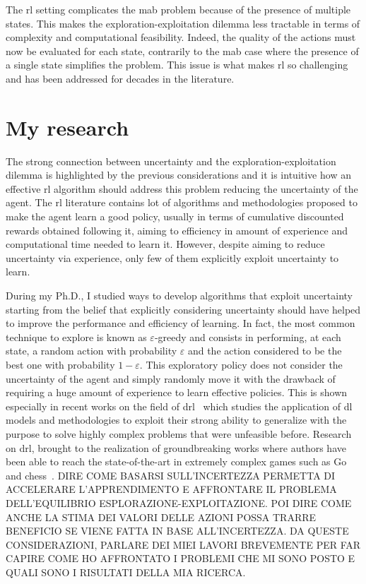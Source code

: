 The \gls{rl} setting complicates the \gls{mab} problem because of the presence of multiple states. This makes the exploration-exploitation dilemma less tractable in terms of complexity and computational feasibility. Indeed, the quality of the actions must now be evaluated for each state, contrarily to the \gls{mab} case where the presence of a single state simplifies the problem. This issue is what makes \gls{rl} so challenging and has been addressed for decades in the literature.

\section{My research}
The strong connection between uncertainty and the exploration-exploitation dilemma is highlighted by the previous considerations and it is intuitive how an effective \gls{rl} algorithm should address this problem reducing the uncertainty of the agent. The \gls{rl} literature contains lot of algorithms and methodologies proposed to make the agent learn a good policy, usually in terms of cumulative discounted rewards obtained following it, aiming to efficiency in amount of experience and computational time needed to learn it. However, despite aiming to reduce uncertainty via experience, only few of them explicitly exploit uncertainty to learn.

During my Ph.D., I studied ways to develop algorithms that exploit uncertainty starting from the belief that explicitly considering uncertainty should have helped to improve the performance and efficiency of learning. In fact, the most common technique to explore is known as $\varepsilon$-greedy and consists in performing, at each state, a random action with probability $\varepsilon$ and the action considered to be the best one with probability $1 - \varepsilon$. This exploratory policy does not consider the uncertainty of the agent and simply randomly move it with the drawback of requiring a huge amount of experience to learn effective policies. This is shown especially in recent works on the field of \gls{drl}~\cite{mnih2015human, van2016deep, wang2015dueling} which studies the application of \gls{dl} models and methodologies to exploit their strong ability to generalize with the purpose to solve highly complex problems that were unfeasible before. Research on \gls{drl}, brought to the realization of groundbreaking works where authors have been able to reach the state-of-the-art in extremely complex games such as Go~\cite{silver2016mastering, silver2017mastering} and chess~\cite{silver2017chess}. DIRE COME BASARSI SULL'INCERTEZZA PERMETTA DI ACCELERARE L'APPRENDIMENTO E AFFRONTARE IL PROBLEMA DELL'EQUILIBRIO ESPLORAZIONE-EXPLOITAZIONE. POI DIRE COME ANCHE LA STIMA DEI VALORI DELLE AZIONI POSSA TRARRE BENEFICIO SE VIENE FATTA IN BASE ALL'INCERTEZZA. DA QUESTE CONSIDERAZIONI, PARLARE DEI MIEI LAVORI BREVEMENTE PER FAR CAPIRE COME HO AFFRONTATO I PROBLEMI CHE MI SONO POSTO E QUALI SONO I RISULTATI DELLA MIA RICERCA.
